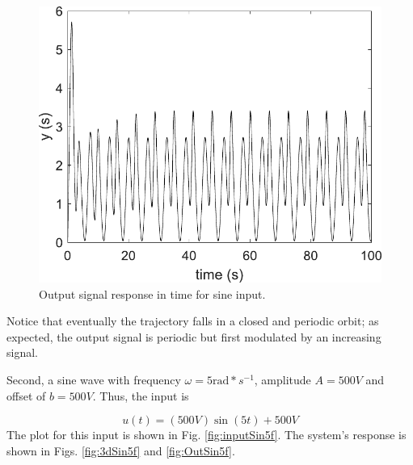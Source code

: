     \begin{figure}[H]
        \centering
        \includegraphics[scale=0.4]{figs/OutSine2fInput.pdf}
        \caption{Output signal response in time for sine input.}
        \label{fig:OutSin2f}
    \end{figure}
    
    Notice that eventually the trajectory falls in a closed and periodic orbit; as expected, the output signal is periodic but first modulated by an increasing signal.
    
    Second, a sine wave with frequency $\omega=5\text{rad}*s^{-1}$, amplitude $A=500V$ and offset of $b=500V$. Thus, the input is
    
    \begin{equation}
        u(t)=(500V)\sin({5t})+500V
    \end{equation}
    The plot for this input is shown in Fig. \ref{fig:inputSin5f}. The system's response is shown in Figs. \ref{fig:3dSin5f} and \ref{fig:OutSin5f}.
    
